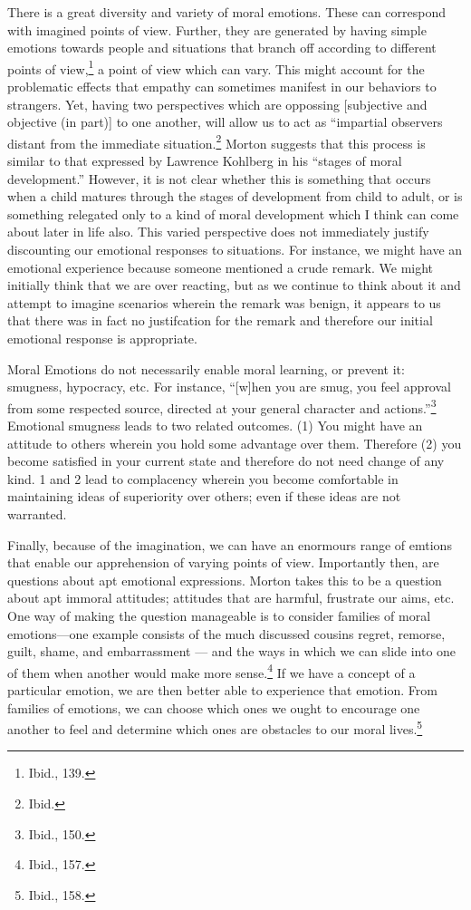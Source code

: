 \documentclass[phdthesis,12pt,final]{wuthesis}
\theoremstyle{definition}
\theoremstyle{definition}
\theoremstyle{definition}
\theoremstyle{definition}
\theoremstyle{remark}
\begin{document}
There is a great diversity and variety of moral emotions. These can correspond with imagined points of view. Further, they are generated by having simple emotions towards people and situations that branch off according to different points of view,\footnote{Ibid., 139.} a point of view which can vary. This might account for the problematic effects that empathy can sometimes manifest in our behaviors to strangers. Yet, having two perspectives which are oppossing {[}subjective and objective (in part){]} to one another, will allow us to act as ``impartial observers distant from the immediate situation.\footnote{Ibid.} Morton suggests that this process is similar to that expressed by Lawrence Kohlberg in his ``stages of moral development.'' However, it is not clear whether this is something that occurs when a child matures through the stages of development from child to adult, or is something relegated only to a kind of moral development which I think can come about later in life also. This varied perspective does not immediately justify discounting our emotional responses to situations. For instance, we might have an emotional experience because someone mentioned a crude remark. We might initially think that we are over reacting, but as we continue to think about it and attempt to imagine scenarios wherein the remark was benign, it appears to us that there was in fact no justifcation for the remark and therefore our initial emotional response is appropriate.

Moral Emotions do not necessarily enable moral learning, or prevent it: smugness, hypocracy, etc. For instance, ``{[}w{]}hen you are smug, you feel approval from some respected source, directed at your general character and actions.''\footnote{Ibid., 150.} Emotional smugness leads to two related outcomes. (1) You might have an attitude to others wherein you hold some advantage over them. Therefore (2) you become satisfied in your current state and therefore do not need change of any kind. 1 and 2 lead to complacency wherein you become comfortable in maintaining ideas of superiority over others; even if these ideas are not warranted.

Finally, because of the imagination, we can have an enormours range of emtions that enable our apprehension of varying points of view. Importantly then, are questions about apt emotional expressions. Morton takes this to be a question about apt immoral attitudes; attitudes that are harmful, frustrate our aims, etc. One way of making
the question manageable is to consider families of moral emotions---one example consists of the much discussed cousins regret, remorse, guilt, shame, and embarrassment --- and the ways in which we can slide into one of them when another would make more sense.\footnote{Ibid., 157.} If we have a concept of a particular emotion, we are then better able to experience that emotion. From families of emotions, we can choose which ones we ought to encourage one another to feel and determine which ones are obstacles to our moral lives.\footnote{Ibid., 158.}
\end{document}
